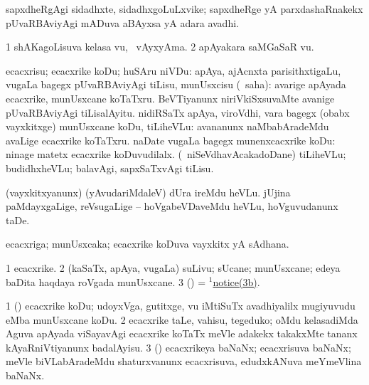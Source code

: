 \bentry
{} 
\gl{\nA}
\expl{}
\bmng
sapxdheRgAgi sidadhxte, sidadhxgoLuLxvike; sapxdheRge yA parxdashaRnakekx pUvaRBAviyAgi mADuva aBAyxsa yA adara avadhi. 
\emng
\eentry

\bentry
{} 
\gl{\nA}
\expl{}
\bmng
\bnum
\num{1} shAKagoLisuva kelasa \mo vu, \udA\ vAyxyAma. 
\num{2} apAyakara saMGaSaR \mo vu. 
\enum
\emng
\eentry

\bentry
{} 
\gl{\sakirx}
\expl{}
\bmng
ecacxrisu; ecacxrike koDu; huSAru niVDu: 
\banum
{} apAya, ajAcnxta parisithxtigaLu, \mo vugaLa bagegx pUvaRBAviyAgi tiLisu, munUsxcisu (\akirx\ saha):  avarige apAyada ecacxrike, munUsxcane koTaTxru.  BeVTiyanunx niriVkiSxsuvaMte avanige pUvaRBAviyAgi tiLisalAyitu. 
 nidiRSaTx apAya, viroVdhi, \mo vara bagegx (obabx vayxkitxge) munUsxcane koDu, tiLiheVLu:  avananunx naMbabAradeMdu avaLige ecacxrike koTaTxru. 
 naDate \mo vugaLa bagegx munenxcacxrike koDu:  ninage matetx ecacxrike koDuvudilalx. 
 (\sA\ niSeVdhavAcakadoDane) tiLiheVLu; budidhxheVLu; balavAgi, sapxSaTxvAgi tiLisu. 
\eanum
\emng

\noindent
\gl{\pagu}
\expl{}
\bmng
\bnum
{}  
\banum
{} (vayxkitxyanunx) (yAvudariMdaleV) dUra ireMdu heVLu. 
 jUjina paMdayxgaLige, reVsugaLige -- hoVgabeVDaveMdu heVLu, hoVguvudanunx taDe. 
\eanum
\numie
\enum
\emng
\eentry

\bentry 
{} 
\gl{\nA}
\expl{}
\bmng
ecacxriga; munUsxcaka; ecacxrike koDuva vayxkitx yA sAdhana. 
\emng
\eentry

\bentry
{} 
\gl{\nA}
\expl{}
\bmng
\bnum
\num{1} ecacxrike. 
\num{2} (kaSaTx, apAya, \mo vugaLa) suLivu; sUcane; munUsxcane;  edeya baDita haqdaya roVgada munUsxcane. 
\num{3} (\pArxparx) = \hyperref{kandict_n.pdf}{N}{notice(1)3b}{$^1$notice(3b)}. 
\enum
\emng

\noindent 
\gl{\pagu}
\expl{}
\bmng
\bnum
\num{1}  (\pArxparx) ecacxrike koDu; udoyxVga, gutitxge, \mo vu iMtiSuTx avadhiyalilx mugiyuvudu eMba munUsxcane koDu. 
\num{2}  ecacxrike taLe, vahisu, tegeduko; oMdu kelasadiMda Aguva apAyada viSayavAgi ecacxrike koTaTx meVle adakekx takakxMte tananx kAyaRniVtiyanunx badalAyisu. 
\num{3}  (\jiVvi) ecacxrikeya baNaNx; ecacxrisuva baNaNx; meVle biVLabAradeMdu shaturxvanunx ecacxrisuva, edudxkANuva meYmeVlina baNaNx. 
\enum
\emng
\eentry

